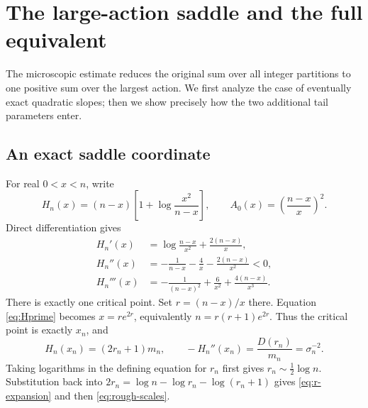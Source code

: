 \documentclass[11pt,a4paper]{article}
\theoremstyle{definition}
\numberwithin{equation}{section}
\begin{document}
\section{The large-action saddle and the full equivalent}
\label{sec:saddle}
The microscopic estimate reduces the original sum over all integer
partitions to one positive sum over the largest action. We first analyze
the case of eventually exact quadratic slopes; then we show precisely how
the two additional tail parameters enter.

\subsection{An exact saddle coordinate}
For real \(0<x<n\), write
\begin{equation}
 H_n(x)=(n-x)\left[1+\log\frac{x^2}{n-x}\right],\qquad
 A_0(x)=\left(\frac{n-x}{x}\right)^2.
 \label{eq:H}
\end{equation}
Direct differentiation gives
\begin{align}
 H_n'(x)&=\log\frac{n-x}{x^2}+\frac{2(n-x)}x,\label{eq:Hprime}\\
 H_n''(x)&=-\frac1{n-x}-\frac4x-\frac{2(n-x)}{x^2}<0,
                      \label{eq:Hsecond}\\
 H_n'''(x)&=-\frac1{(n-x)^2}+\frac6{x^2}
                                      +\frac{4(n-x)}{x^3}.
                      \label{eq:Hthird}
\end{align}
There is exactly one critical point. Set \(r=(n-x)/x\) there.
Equation \eqref{eq:Hprime} becomes \(x=re^{2r}\), equivalently
\(n=r(r+1)e^{2r}\). Thus the critical point is exactly \(x_n\), and
\begin{equation}
 H_n(x_n)=(2r_n+1)m_n,\qquad
 -H_n''(x_n)=\frac{D(r_n)}{m_n}=\sigma_n^{-2}.
 \label{eq:saddle-identities}
\end{equation}
Taking logarithms in the defining equation for \(r_n\) first gives
\(r_n\sim\tfrac12\log n\). Substitution back into
\(2r_n=\log n-\log r_n-\log(r_n+1)\) gives
\eqref{eq:r-expansion} and then \eqref{eq:rough-scales}.
\end{document}
